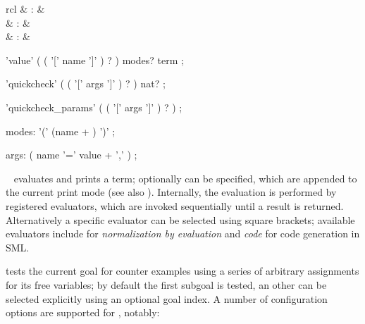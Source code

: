 \begin{isabellebody}
\begin{isamarkuptext}
  \begin{matharray}{rcl}
    \hypertarget{command.HOL.value}{\hyperlink{command.HOL.value}{\mbox{}}}\isa{{\isachardoublequote}\isactrlsup {\isacharasterisk}{\isachardoublequote}} & : &  \\
    \hypertarget{command.HOL.quickcheck}{\hyperlink{command.HOL.quickcheck}{\mbox{}}}\isa{{\isachardoublequote}\isactrlsup {\isacharasterisk}{\isachardoublequote}} & : &  \\
    \hypertarget{command.HOL.quickcheck-params}{\hyperlink{command.HOL.quickcheck-params}{\mbox{}}} & : & 
  \end{matharray}

  \begin{rail}
    'value' ( ( '[' name ']' ) ? ) modes? term
    ;

    'quickcheck' ( ( '[' args ']' ) ? ) nat?
    ;

    'quickcheck_params' ( ( '[' args ']' ) ? )
    ;

    modes: '(' (name + ) ')'
    ;

    args: ( name '=' value + ',' )
    ;
  \end{rail}

  \begin{description}

  \item \hyperlink{command.HOL.value}{\mbox{}}~ evaluates and prints a
    term; optionally  can be specified, which are
    appended to the current print mode (see also \cite{isabelle-ref}).
    Internally, the evaluation is performed by registered evaluators,
    which are invoked sequentially until a result is returned.
    Alternatively a specific evaluator can be selected using square
    brackets; available evaluators include  for
    \emph{normalization by evaluation} and \emph{code} for code
    generation in SML.

  \item \hyperlink{command.HOL.quickcheck}{\mbox{}} tests the current goal for
    counter examples using a series of arbitrary assignments for its
    free variables; by default the first subgoal is tested, an other
    can be selected explicitly using an optional goal index.
    A number of configuration options are supported for
    \hyperlink{command.HOL.quickcheck}{\mbox{}}, notably:


\end{description}
\end{isamarkuptext}
\end{isabellebody}
